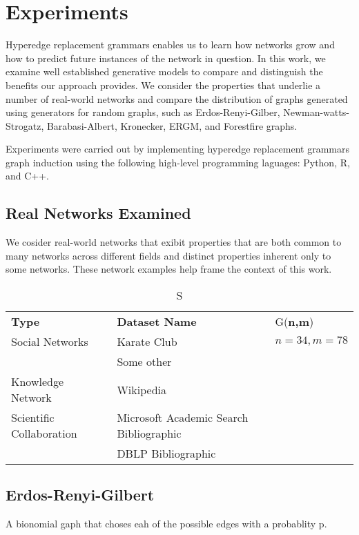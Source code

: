 \section{Experiments}

Hyperedge replacement grammars enables us to learn how networks grow and how to predict future instances of the network in question. In this work, we examine well established generative models to compare and distinguish the benefits our approach provides. We consider the properties that underlie a number of real-world networks and compare the distribution of graphs generated using generators for random graphs, such as Erdos-Renyi-Gilber, Newman-watts-Strogatz, Barabasi-Albert, Kronecker, ERGM, and Forestfire graphs.

Experiments were carried out by implementing hyperedge replacement grammars graph induction using the following high-level programming laguages: Python, R, and C++.  

\subsection{Real Networks Examined}
We cosider real-world networks that exibit properties that are both common to many networks across different fields and distinct properties inherent only to some networks. These network examples help frame the context of this work. 

\begin{table}[h]
\centering
\caption{S}
\renewcommand\arraystretch{1.3}
\renewcommand\tabcolsep{4pt}
  \begin{tabular}{p{2cm}ll}
  \textbf{Type} & \textbf{Dataset Name} & G(\textbf{n,m}) \\%
  Social Networks & Karate Club & $n = 34, m=78$ \\
  	& Some other & \\
  Knowledge Network & Wikipedia \\
  Scientific Collaboration & Microsoft Academic Search Bibliographic & \\
  & DBLP Bibliographic  & \\
\end{tabular}
\label{tab:dsstats}
\end{table}



\subsection{Erdos-Renyi-Gilbert}
A bionomial gaph that choses eah of the possible edges with a probablity p.
